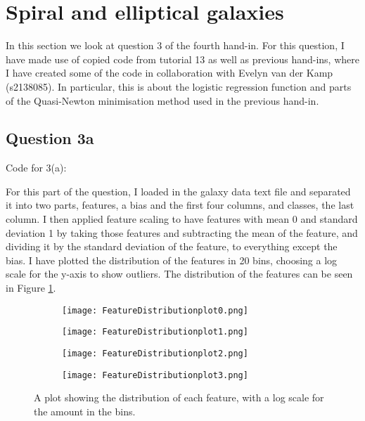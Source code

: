\section{Spiral and elliptical galaxies}

In this section we look at question 3 of the fourth hand-in. 
For this question, I have made use of copied code from tutorial 13 as well as previous hand-ins, where I have created some of the code in collaboration with Evelyn van der Kamp (s2138085).
In particular, this is about the logistic regression function and parts of the Quasi-Newton minimisation method used in the previous hand-in.

\subsection{Question 3a}

Code for 3(a):


For this part of the question, I loaded in the galaxy data text file and separated it into two parts, features, a bias and the first four columns, and classes, the last column.
I then applied feature scaling to have features with mean 0 and standard deviation 1 by taking those features and subtracting the mean of the feature, and dividing it by the standard deviation of the feature, to everything except the bias.
I have plotted the distribution of the features in 20 bins, choosing a log scale for the y-axis to show outliers.
The distribution of the features can be seen in Figure \ref{fig:FD}.

\begin{figure}[ht!]
\begin{center}
        \begin{subfigure}{.49\textwidth}
      \centering
      \texttt{[image: FeatureDistributionplot0.png]}
    \end{subfigure}
    \begin{subfigure}{.49\textwidth}
      \centering
      \texttt{[image: FeatureDistributionplot1.png]}
    \end{subfigure}
    \begin{subfigure}{.49\textwidth}
      \centering
      \texttt{[image: FeatureDistributionplot2.png]}
    \end{subfigure}
    \begin{subfigure}{.49\textwidth}
      \centering
      \texttt{[image: FeatureDistributionplot3.png]}
    \end{subfigure}
    \caption{A plot showing the distribution of each feature, with a log scale for the amount in the bins.}
    \label{fig:FD}
\end{center}
\end{figure}


